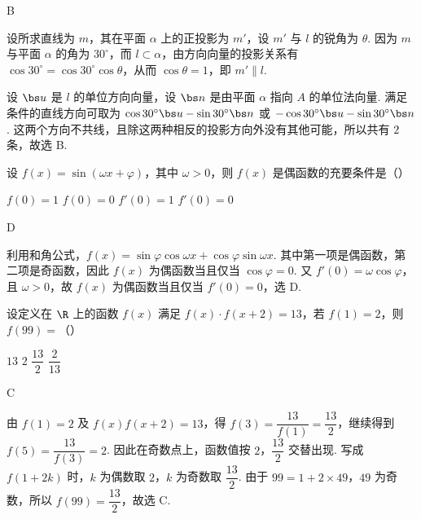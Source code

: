 \begin{answer}
B
\end{answer}

\begin{solution}
设所求直线为 \(m\)，其在平面 \(\alpha\) 上的正投影为 \(m'\)，设 \(m'\) 与 \(l\) 的锐角为 \(\theta\). 因为 \(m\) 与平面 \(\alpha\) 的角为 \(30^{\circ}\)，而 \(l\subset\alpha\)，由方向向量的投影关系有 \(\cos30^{\circ}=\cos30^{\circ}\cos\theta\)，从而 \(\cos\theta=1\)，即 \(m'\parallel l\).

设 \(\bs u\) 是 \(l\) 的单位方向向量，设 \(\bs n\) 是由平面 \(\alpha\) 指向 \(A\) 的单位法向量. 满足条件的直线方向可取为 \(\cos30^{\circ}\bs u-\sin30^{\circ}\bs n\) 或 \(-\cos30^{\circ}\bs u-\sin30^{\circ}\bs n\). 这两个方向不共线，且除这两种相反的投影方向外没有其他可能，所以共有 \(2\) 条，故选 B.
\end{solution}

\begin{problem}
设 \(f(x)=\sin(\omega x+\varphi)\)，其中 \(\omega>0\)，则 \(f(x)\) 是偶函数的充要条件是（\quad）

\choices
    {\(f(0)=1\)}
    {\(f(0)=0\)}
    {\(f'(0)=1\)}
    {\(f'(0)=0\)}
\end{problem}

\begin{answer}
D
\end{answer}

\begin{solution}
利用和角公式，\(f(x)=\sin\varphi\cos\omega x+\cos\varphi\sin\omega x\). 其中第一项是偶函数，第二项是奇函数，因此 \(f(x)\) 为偶函数当且仅当 \(\cos\varphi=0\). 又 \(f'(0)=\omega\cos\varphi\)，且 \(\omega>0\)，故 \(f(x)\) 为偶函数当且仅当 \(f'(0)=0\)，选 D.
\end{solution}

\begin{problem}
设定义在 \(\R\) 上的函数 \(f(x)\) 满足 \(f(x)\cdot f(x+2)=13\)，若 \(f(1)=2\)，则 \(f(99)=\)（\quad）

\choices
    {\(13\)}
    {\(2\)}
    {\(\dfrac{13}{2}\)}
    {\(\dfrac{2}{13}\)}
\end{problem}

\begin{answer}
C
\end{answer}

\begin{solution}
由 \(f(1)=2\) 及 \(f(x)f(x+2)=13\)，得 \(f(3)=\dfrac{13}{f(1)}=\dfrac{13}{2}\)，继续得到 \(f(5)=\dfrac{13}{f(3)}=2\). 因此在奇数点上，函数值按 \(2\)，\(\dfrac{13}{2}\) 交替出现. 写成 \(f(1+2k)\) 时，\(k\) 为偶数取 \(2\)，\(k\) 为奇数取 \(\dfrac{13}{2}\). 由于 \(99=1+2\times49\)，\(49\) 为奇数，所以 \(f(99)=\dfrac{13}{2}\)，故选 C.
\end{solution}

